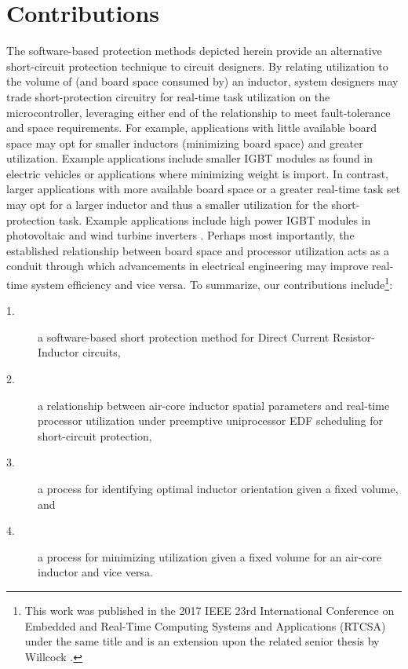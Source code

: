 \documentclass[11pt,oneside]{report}
\begin{document}
    \section{Contributions}
    The software-based protection methods depicted herein provide an alternative short-circuit protection technique to circuit designers. By relating utilization to the volume of (and board space consumed by) an inductor, system designers may trade short-protection circuitry for real-time task utilization on the microcontroller, leveraging either end of the relationship to meet fault-tolerance and space requirements. For example, applications with little available board space may opt for smaller inductors (minimizing board space) and greater utilization. Example applications include smaller IGBT modules as found in electric vehicles or applications where minimizing weight is import\cite{IGBTvehicle}. In contrast, larger applications with more available board space or a greater real-time task set may opt for a larger inductor and thus a smaller utilization for the short-protection task. Example applications include high power IGBT modules in photovoltaic and wind turbine inverters \cite{photoVoltaic}\cite{hiPowerIGBTwind}. Perhaps most importantly, the established relationship between board space and processor utilization acts as a conduit through which advancements in electrical engineering may improve real-time system efficiency and vice versa.
    To summarize, our contributions include\footnote{This work was published in the 2017 IEEE 23rd International Conference on Embedded and Real-Time Computing Systems and Applications (RTCSA) under the same title \cite{tufc} and is an extension upon the related senior thesis by Willcock \cite{seniorThesis}.}:%
    \begin{description}
    \item [1.] a software-based short protection method for Direct Current Resistor-Inductor circuits,
    \item [2.] a relationship between air-core inductor spatial parameters and real-time processor utilization under preemptive uniprocessor EDF scheduling for short-circuit protection,
    \item [3.] a process for identifying optimal inductor orientation given a fixed volume, and
    \item [4.] a process for minimizing utilization given a fixed volume for an air-core inductor and vice versa.
    \end{description}
    
\end{document}
